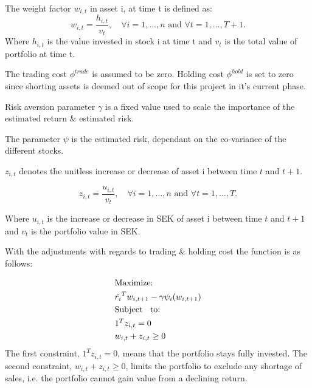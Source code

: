 \documentclass{LTHtwocol} %
\begin{document}
The weight factor $w_{i,t}$ in asset i, at time t is defined as:
$$
w_{i,t} = \frac{h_{i,t}}{v_{t}}, \quad \forall i=1,\ldots,n \text{ and } \forall t = 1,\ldots,T+1.
$$
Where $h_{i,t}$ is the value invested in stock i at time t and $v_{t}$ is the total value of portfolio at time t.

The trading cost $\phi^{trade}$ is assumed to be zero. Holding cost $\phi^{hold}$ is set to zero since shorting assets is deemed out of scope for this project in it's current phase.

Risk aversion parameter $\gamma$ is a fixed value used to scale the importance of the estimated return \& estimated risk.

The parameter $\psi$ is the estimated risk, dependant on the co-variance of the different stocks. 

$z_{i,t}$ denotes the unitless increase or decrease of asset i between time $t$ and $t+1$.  

$$
z_{i,t} = \frac{u_{i,t}}{v_{t}}, \quad \forall i=1,\ldots,n \text{ and } \forall t = 1,\ldots,T.
$$

Where $u_{i,t}$ is the increase or decrease in SEK of asset i between time $t$ and $t+1$ and $v_{t}$ is the portfolio value in SEK.

With the adjustments with regards to trading \& holding cost the function is as follows:

\begin{equation}
 \begin{split}
 &\text{Maximize:}\\
 &\hat{r_i }^T w_{i,t+1}  -\gamma\psi_i(w_{i,t+1}) \\
&\text{Subject \: to:} \\
&1^{T}z_{i,t} = 0\\
&w_{i,t}+z_{i,t} \geq 0
\end{split}
\end{equation}
The first constraint, $1^{T}z_{i,t} = 0$, means that the portfolio stays fully invested. The second constraint, $w_{i,t}+z_{i,t} \geq 0$, limits the portfolio to exclude any shortage of sales, i.e. the portfolio cannot gain value from a declining return. \cite{Boyd}
\end{document}
